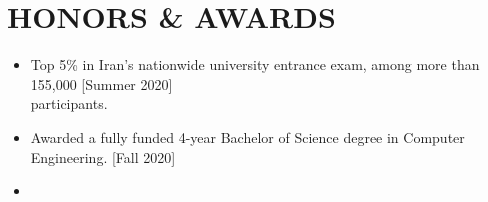 \documentclass[11pt,letter,sans]{moderncv} %
\begin{document}
        
\section{HONORS \& AWARDS}
    \begin{itemize}
        \item  Top 5\% in Iran's nationwide university entrance exam, among more than 155,000  \hfill[Summer 2020]\\participants.
        \vspace{0.2em}
        \item Awarded a fully funded 4-year Bachelor of Science degree in Computer Engineering. \hfill[Fall 2020]
        \item 
    \end{itemize}
\end{document}
